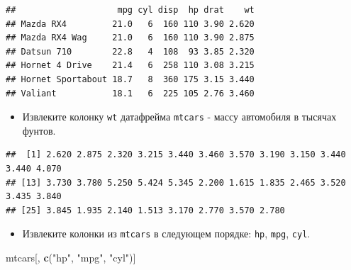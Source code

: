 \documentclass[]{book}
\newenvironment{Shaded}{\begin{snugshade}}{\end{snugshade}}
\newcommand{\KeywordTok}[1]{\textcolor[rgb]{0.13,0.29,0.53}{\textbf{#1}}}
\newcommand{\StringTok}[1]{\textcolor[rgb]{0.31,0.60,0.02}{#1}}
\newcommand{\OperatorTok}[1]{\textcolor[rgb]{0.81,0.36,0.00}{\textbf{#1}}}
\newcommand{\NormalTok}[1]{#1}
\providecommand{\tightlist}{%
  \setlength{\itemsep}{0pt}\setlength{\parskip}{0pt}}
\begin{document}
\begin{verbatim}
##                    mpg cyl disp  hp drat    wt
## Mazda RX4         21.0   6  160 110 3.90 2.620
## Mazda RX4 Wag     21.0   6  160 110 3.90 2.875
## Datsun 710        22.8   4  108  93 3.85 2.320
## Hornet 4 Drive    21.4   6  258 110 3.08 3.215
## Hornet Sportabout 18.7   8  360 175 3.15 3.440
## Valiant           18.1   6  225 105 2.76 3.460
\end{verbatim}

\begin{itemize}
\tightlist
\item
  Извлеките колонку \texttt{wt} датафрейма \texttt{mtcars} - массу
  автомобиля в тысячах фунтов.
\end{itemize}

\begin{Shaded}
\end{Shaded}

\begin{verbatim}
##  [1] 2.620 2.875 2.320 3.215 3.440 3.460 3.570 3.190 3.150 3.440 3.440 4.070
## [13] 3.730 3.780 5.250 5.424 5.345 2.200 1.615 1.835 2.465 3.520 3.435 3.840
## [25] 3.845 1.935 2.140 1.513 3.170 2.770 3.570 2.780
\end{verbatim}

\begin{itemize}
\tightlist
\item
  Извлеките колонки из \texttt{mtcars} в следующем порядке: \texttt{hp},
  \texttt{mpg}, \texttt{cyl}.
\end{itemize}

\begin{Shaded}
\begin{Highlighting}[]
\NormalTok{mtcars[, }\KeywordTok{c}\NormalTok{(}\StringTok{"hp"}\NormalTok{, }\StringTok{"mpg"}\NormalTok{, }\StringTok{"cyl"}\NormalTok{)]}
\end{Highlighting}
\end{Shaded}
\end{document}
